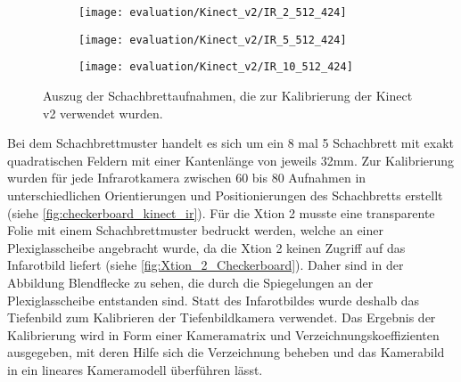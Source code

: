 \documentclass[thesis.tex]{subfiles}
\begin{document}
\begin{figure}[h!]
\centering
\begin{subfigure}{.32\textwidth}
    \centering
    \texttt{[image: evaluation/Kinect\_v2/IR\_2\_512\_424]}
\end{subfigure}%
\begin{subfigure}{.32\textwidth}
    \centering
    \texttt{[image: evaluation/Kinect\_v2/IR\_5\_512\_424]}
\end{subfigure}
\begin{subfigure}{.32\textwidth}
    \centering
    \texttt{[image: evaluation/Kinect\_v2/IR\_10\_512\_424]}
\end{subfigure}
\caption{Auszug der Schachbrettaufnahmen, die zur Kalibrierung der Kinect v2 verwendet wurden.}
\label{fig:checkerboard_kinect_ir}
\end{figure}

Bei dem Schachbrettmuster handelt es sich um ein 8 mal 5 Schachbrett mit exakt quadratischen Feldern mit einer Kantenlänge von jeweils 32mm. Zur Kalibrierung wurden für jede Infrarotkamera zwischen 60 bis 80 Aufnahmen in unterschiedlichen Orientierungen und Positionierungen des Schachbretts erstellt (siehe \autoref{fig:checkerboard_kinect_ir}). Für die Xtion 2 musste eine transparente Folie mit einem Schachbrettmuster bedruckt werden, welche an einer Plexiglasscheibe angebracht wurde, da die Xtion 2 keinen Zugriff auf das Infarotbild liefert (siehe \autoref{fig:Xtion_2_Checkerboard}). Daher sind in der Abbildung Blendflecke zu sehen, die durch die Spiegelungen an der Plexiglasscheibe entstanden sind. Statt des Infarotbildes wurde deshalb das Tiefenbild zum Kalibrieren der Tiefenbildkamera verwendet. Das Ergebnis der Kalibrierung wird in Form einer Kameramatrix und Verzeichnungskoeffizienten ausgegeben, mit deren Hilfe sich die Verzeichnung beheben und das Kamerabild in ein lineares Kameramodell überführen lässt.
\end{document}
